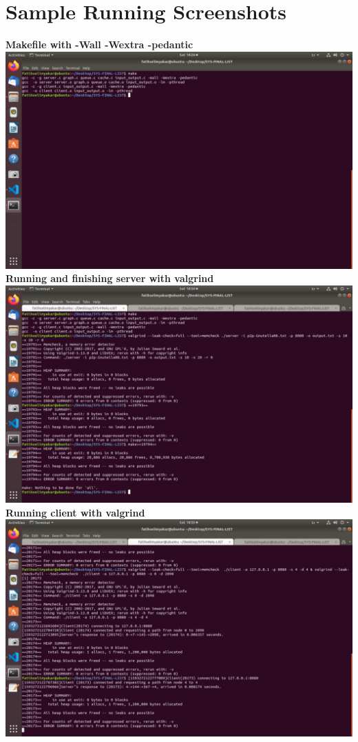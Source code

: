 \documentclass{article}
\begin{document}
\section{Sample Running Screenshots \\}
\begin{center}
    \textbf{Makefile with -Wall -Wextra -pedantic \\}
    \includegraphics[scale=0.32]{makefile.png} \\[0.5in]
    \textbf{Running and finishing server with valgrind} \\
    \includegraphics[scale=0.32]{server.png}
    \newpage
    \textbf{Running client with valgrind} \\
    \includegraphics[scale=0.32]{client.png} \\[0.5in]

\end{center}
\end{document}
